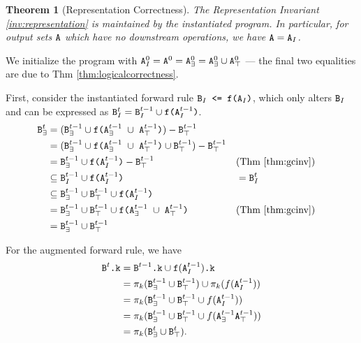 \documentclass[10pt]{proc}
\numberwithin{equation}{section}
\newtheorem{thm}[theorem]{Theorem}
\newenvironment{proof}[1][Proof]{\begin{trivlist}\item[\hskip \labelsep {\textit {#1:}}]}{\end{trivlist}}
\renewcommand{\tt}[1]{\ifmmode\text{\texttt{#1}}\else\texttt{#1}\fi}
\begin{document}
\begin{thm}[Representation Correctness]\label{thm:representationcorrectness}
The Representation Invariant \ref{inv:representation} is maintained by the instantiated program.
In particular, for output sets $\tt{A}$ which have no downstream operations, we have $\tt{A} = \tt{A}_I$.
\end{thm}
\begin{proof}
We initialize the program with $\tt{A}_I^0 = \tt{A}^0 = \tt{A}_\exists^0 = \tt{A}_\exists^0 \cup \tt{A}_\top^0$ --- the final two equalities are due to Thm \ref{thm:logicalcorrectness}.

First, consider the instantiated forward rule $\tt{B}_I \tt{ <= f(A$_I$)}$, which only alters $\tt{B}_I$ and can be expressed as $\tt{B}_I^t = \tt{B}_I^{t-1} \cup \tt{f(A$_I^{t-1}$)}$.
\begin{align*}
\tt{B}_\exists^t
&= (\tt{B}_\exists^{t-1} \cup \tt{f(A$_\exists^{t-1}$ $\cup$ A$_\top^{t-1}$)}) - \tt{B}_\top^{t-1}\\
&= (\tt{B}_\exists^{t-1} \cup \tt{f(A$_\exists^{t-1}$ $\cup$ A$_\top^{t-1}$)} \cup \tt{B}_\top^{t-1}) - \tt{B}_\top^{t-1}\\
&= \tt{B}_\exists^{t-1} \cup \tt{f(A$_I^{t-1}$)} - \tt{B}_\top^{t-1} && \text{(Thm \ref{thm:gcinv})} \\
&\subseteq \tt{B}_I^{t-1} \cup \tt{f(A$_I^{t-1}$)}
&&= \tt{B}_I^t\\
&\subseteq \tt{B}_\exists^{t-1} \cup \tt{B}_\top^{t-1} \cup \tt{f(A$_I^{t-1}$)}\\
&=\tt{B}_\exists^{t-1} \cup \tt{B}_\top^{t-1} \cup \tt{f(A$_\exists^{t-1}$ $\cup$ A$_\top^{t-1}$)} && \text{(Thm \ref{thm:gcinv})}\\
&=\tt{B}_\exists^{t-1} \cup \tt{B}_\top^{t-1}
\end{align*}

For the augmented forward rule, we have
\begin{align*}
\tt{B}^t\tt{.k}
&= \tt{B}^{t-1}\tt{.k} \cup \tt{f}(\tt{A}^{t-1}_I)\tt{.k}\\
&= \pi_k(\tt{B}^{t-1}_\exists \cup \tt{B}^{t-1}_\top) \cup \pi_k(f(\tt{A}^{t-1}_I))\\
&= \pi_k(\tt{B}^{t-1}_\exists \cup \tt{B}^{t-1}_\top \cup f(\tt{A}^{t-1}_I))\\
&= \pi_k(\tt{B}^{t-1}_\exists \cup \tt{B}^{t-1}_\top \cup f(\tt{A}^{t-1}_\exists \tt{A}^{t-1}_\top))\\
&= \pi_k(\tt{B}^t_\exists \cup \tt{B}^t_\top).
\end{align*}


\end{proof}
\end{document}
